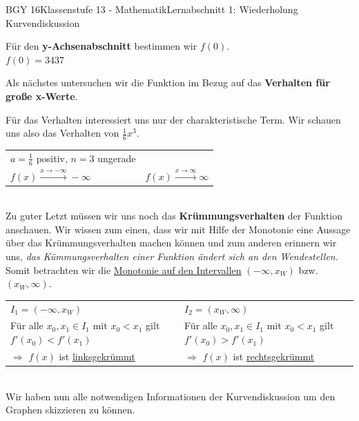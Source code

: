 \documentclass[oneside,openany,headings=optiontotoc,11pt,numbers=noenddot]{scrreprt}
\begin{document}
\begin{worksheet}{BGY 16}{Klassenstufe 13 - Mathematik}{Lernabschnitt 1: Wiederholung Kurvendiskussion}
\begin{framed}
			\par\noindent
			Für den \textbf{y-Achsenabschnitt} bestimmen wir \(f(0)\).\\
			\colorbox{green!10}{\(f(0) = 3437\)}\\
			\par\noindent
			Als nächstes untersuchen wir die Funktion im Bezug auf das \textbf{Verhalten für große x-Werte}.\\
			\par\noindent
			Für das Verhalten interessiert uns nur der charakteristische Term. Wir schauen uns also das Verhalten von \(\frac{1}{6}x^3\).\\
			\par\noindent
			\begin{tabularx}{\textwidth}{X|X}
				\(a= \frac{1}{6}\) positiv, \(n=3\) ungerade\\
				\colorbox{green!10}{\(f(x)\xrightarrow{x\rightarrow-\infty}-\infty\)} & \colorbox{green!10}{\(f(x)\xrightarrow{x\rightarrow\infty}\infty\)}
			\end{tabularx}\\
			Zu guter Letzt müssen wir uns noch das \textbf{Krümmungsverhalten} der Funktion anschauen. Wir wissen zum einen, dass wir mit Hilfe der Monotonie eine Aussage über das Krümmungsverhalten machen können und zum anderen erinnern wir uns, \textit{das Kümmungsverhalten einer Funktion ändert sich an den Wendestellen}.\\
			Somit betrachten wir die \underline{Monotonie auf den Intervallen} \(\left(-\infty,x_W\right)\) bzw. \(\left(x_W,\infty\right)\).\\
			\par\noindent
			\begin{tabularx}{\textwidth}{X|X}
				\(I_1 = \left(-\infty,x_W\right)\) & \(I_2 = \left(x_W,\infty\right)\)\\
				Für alle \(x_0,x_1 \in I_1\) mit \(x_0 < x_1\) gilt \(f'(x_0) < f'(x_1)\) & Für alle \(x_0,x_1 \in I_1\) mit \(x_0 < x_1\) gilt \(f'(x_0) > f'(x_1)\)\\
				\(\Rightarrow\) \colorbox{green!10}{\(f(x)\) ist \underline{linksgekrümmt}} & \(\Rightarrow\) \colorbox{green!10}{\(f(x)\) ist \underline{rechtsgekrümmt}}
			\end{tabularx}\\
			Wir haben nun alle notwendigen Informationen der Kurvendiskussion um den Graphen skizzieren zu können.
			\begin{center}

\end{center}
\end{framed}
\end{worksheet}
\end{document}
